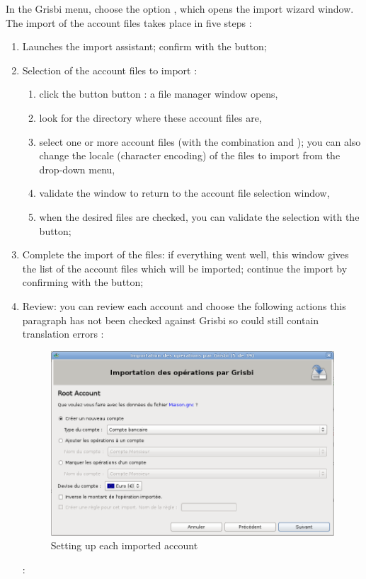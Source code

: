 
In the Grisbi  menu, choose the option  , which opens the import wizard window. The import of the account files takes place in five steps :

\begin{enumerate}
	\item Launches the import assistant; confirm with the  button;
	\item Selection of the account files to import :	
		\begin{enumerate}
			\item click the button  button : a file manager window opens,	
			\item look for the directory where these account files are,
			\item select one or more account files (with the combination    and ); you can also change the \gls{locale} (\gls{character encoding}) of the files to import from the  drop-down menu,
			\item validate the window to return to the account file selection window,
			\item when the desired files are checked, you can validate the selection with the  button;
		\end{enumerate}		  
	\item Complete the import of the files: if everything went well, this window gives the list of the account files which will be imported; continue the import by confirming with the  button;
	\item Review: you can review each account and choose the following actions  this paragraph has not been checked against Grisbi so could still contain translation errors \ifIllustration {} :
	\begin{figure}[htbp]
	\begin{center}
	\includegraphics[scale=0.5]{image/screenshot/QIF_import_files_setup}
	\end{center}
	\caption{Setting up each imported account}
	\label{QIF-import-files-setup-img}
	\end{figure}
	\else  :
	\fi
	

\end{enumerate}

